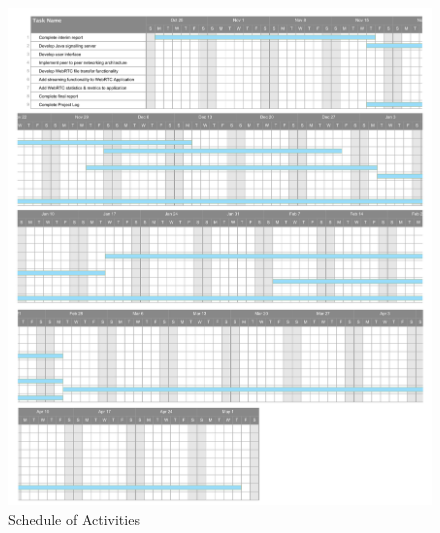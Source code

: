 \documentclass[]{report}
\begin{document}
	\newpage
	\begin{figure}[h!]
		\caption{Schedule of Activities}
		\includegraphics[scale=0.5]{ganttchart.png}
	\end{figure}
	\newpage	
	
\end{document}
